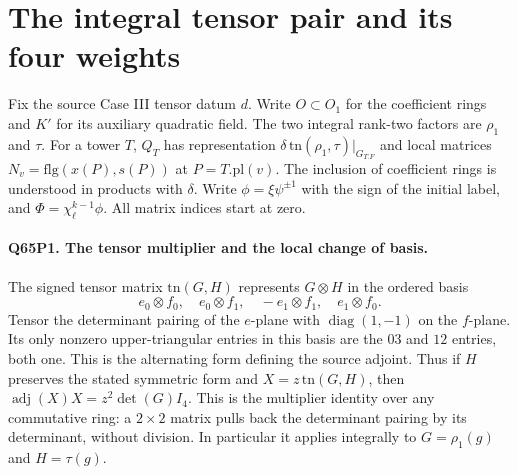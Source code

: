 \section{The integral tensor pair and its four weights}
\label{sec:tensor-integral65}
Fix the source Case III tensor datum $d$. Write $O\subset O_1$ for
the coefficient rings and $K'$ for its auxiliary quadratic field.
The two integral rank-two factors are $\rho_1$ and $\tau$.
For a tower $T$, $Q_T$ has representation
$\delta\,\mathrm{tn}(\rho_1,\tau)|_{G_{T.F}}$ and local matrices
$N_v=\mathrm{flg}(x(P),s(P))$ at $P=T.\mathrm{pl}(v)$.
The inclusion of coefficient rings is understood in products with
$\delta$. Write $\phi=\xi\psi^{\pm1}$ with the sign of the initial
label, and $\Phi=\chi_\ell^{k-1}\phi$. All matrix indices start at zero.

\paragraph{Q65P1. The tensor multiplier and the local change of basis.}
The signed tensor matrix $\mathrm{tn}(G,H)$ represents $G\otimes H$
in the ordered basis
\[
 e_0\otimes f_0,\quad e_0\otimes f_1,\quad
          -e_1\otimes f_1,\quad e_1\otimes f_0 .
\]
Tensor the determinant pairing of the $e$-plane with
$\operatorname{diag}(1,-1)$ on the $f$-plane. Its only nonzero
upper-triangular entries in this basis are the $03$ and $12$ entries,
both one. This is the alternating form defining the source adjoint.
Thus if $H$ preserves the stated symmetric form and
$X=z\,\mathrm{tn}(G,H)$, then $\operatorname{adj}(X)X=z^2\det(G)I_4$. This is the multiplier identity over any commutative
ring: a $2\times2$ matrix pulls back the determinant pairing by its
determinant, without division. In particular it applies integrally
to $G=\rho_1(g)$ and $H=\tau(g)$.

